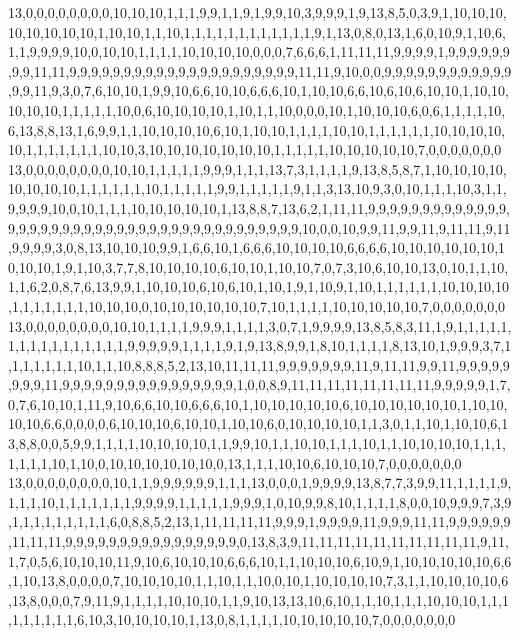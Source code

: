 13,0,0,0,0,0,0,0,0,10,10,10,1,1,1,9,9,1,1,9,1,9,9,10,3,9,9,9,1,9,13,8,5,0,3,9,1,10,10,10,10,10,10,10,10,1,10,10,1,1,10,1,1,1,1,1,1,1,1,1,1,1,1,9,1,13,0,8,0,13,1,6,0,10,9,1,10,6,1,1,9,9,9,9,10,0,10,10,1,1,1,1,10,10,10,10,0,0,0,7,6,6,6,1,11,11,11,9,9,9,9,1,9,9,9,9,9,9,9,9,11,11,9,9,9,9,9,9,9,9,9,9,9,9,9,9,9,9,9,9,9,9,9,11,11,9,10,0,0,9,9,9,9,9,9,9,9,9,9,9,9,9,9,11,9,3,0,7,6,10,10,1,9,9,10,6,6,10,10,6,6,6,10,1,10,10,6,6,10,6,10,6,10,10,1,10,10,10,10,10,1,1,1,1,1,10,0,6,10,10,10,10,1,10,1,1,10,0,0,0,10,1,10,10,10,6,0,6,1,1,1,1,10,6,13,8,8,13,1,6,9,9,1,1,10,10,10,10,6,10,1,10,10,1,1,1,1,10,10,1,1,1,1,1,1,10,10,10,10,10,1,1,1,1,1,1,1,10,10,3,10,10,10,10,10,10,10,1,1,1,1,1,10,10,10,10,10,7,0,0,0,0,0,0,0
13,0,0,0,0,0,0,0,0,10,10,1,1,1,1,1,9,9,9,1,1,1,13,7,3,1,1,1,1,9,13,8,5,8,7,1,10,10,10,10,10,10,10,10,1,1,1,1,1,1,10,1,1,1,1,1,9,9,1,1,1,1,1,9,1,1,3,13,10,9,3,0,10,1,1,1,10,3,1,1,9,9,9,9,10,0,10,1,1,1,10,10,10,10,10,1,13,8,8,7,13,6,2,1,11,11,9,9,9,9,9,9,9,9,9,9,9,9,9,9,9,9,9,9,9,9,9,9,9,9,9,9,9,9,9,9,9,9,9,9,9,9,9,9,9,9,10,0,0,10,9,9,11,9,9,11,9,11,11,9,11,9,9,9,9,3,0,8,13,10,10,10,9,9,1,6,6,10,1,6,6,6,10,10,10,10,6,6,6,6,10,10,10,10,10,10,10,10,10,1,9,1,10,3,7,7,8,10,10,10,10,6,10,10,1,10,10,7,0,7,3,10,6,10,10,13,0,10,1,1,10,1,1,6,2,0,8,7,6,13,9,9,1,10,10,10,6,10,6,10,1,10,1,9,1,10,9,1,10,1,1,1,1,1,1,10,10,10,10,1,1,1,1,1,1,1,10,10,10,0,10,10,10,10,10,10,7,10,1,1,1,1,10,10,10,10,10,7,0,0,0,0,0,0,0
13,0,0,0,0,0,0,0,0,10,10,1,1,1,1,9,9,9,1,1,1,1,3,0,7,1,9,9,9,9,13,8,5,8,3,11,1,9,1,1,1,1,1,1,1,1,1,1,1,1,1,1,1,1,9,9,9,9,9,1,1,1,1,9,1,9,13,8,9,9,1,8,10,1,1,1,1,8,13,10,1,9,9,9,3,7,1,1,1,1,1,1,1,10,1,1,10,8,8,8,5,2,13,10,11,11,11,9,9,9,9,9,9,9,11,9,11,11,9,9,11,9,9,9,9,9,9,9,9,11,9,9,9,9,9,9,9,9,9,9,9,9,9,9,9,9,1,0,0,8,9,11,11,11,11,11,11,11,11,9,9,9,9,9,1,7,0,7,6,10,10,1,11,9,10,6,6,10,10,6,6,6,10,1,10,10,10,10,10,6,10,10,10,10,10,10,1,10,10,10,10,6,6,0,0,0,0,6,10,10,10,6,10,10,1,10,10,6,0,10,10,10,10,1,1,3,0,1,1,10,1,10,10,6,13,8,8,0,0,5,9,9,1,1,1,1,10,10,10,10,1,1,9,9,10,1,1,10,10,1,1,1,10,1,1,10,10,10,10,1,1,1,1,1,1,1,10,1,10,0,10,10,10,10,10,10,0,13,1,1,1,10,10,6,10,10,10,7,0,0,0,0,0,0,0
13,0,0,0,0,0,0,0,0,10,1,1,9,9,9,9,9,9,1,1,1,13,0,0,0,1,9,9,9,9,13,8,7,7,3,9,9,11,1,1,1,1,9,1,1,1,10,1,1,1,1,1,1,1,9,9,9,9,1,1,1,1,1,9,9,9,1,0,10,9,9,8,10,1,1,1,1,8,0,0,10,9,9,9,7,3,9,1,1,1,1,1,1,1,1,1,6,0,8,8,5,2,13,1,11,11,11,11,9,9,9,1,9,9,9,9,11,9,9,9,11,11,9,9,9,9,9,9,11,11,11,9,9,9,9,9,9,9,9,9,9,9,9,9,9,9,9,0,13,8,3,9,11,11,11,11,11,11,11,11,11,11,9,11,1,7,0,5,6,10,10,10,11,9,10,6,10,10,10,6,6,6,10,1,1,10,10,10,6,10,9,1,10,10,10,10,10,6,6,1,10,13,8,0,0,0,0,7,10,10,10,10,1,1,10,1,1,10,0,10,1,10,10,10,10,7,3,1,1,10,10,10,10,6,13,8,0,0,0,7,9,11,9,1,1,1,1,10,10,10,1,1,9,10,13,13,10,6,10,1,1,10,1,1,1,10,10,10,1,1,1,1,1,1,1,1,1,6,10,3,10,10,10,10,1,13,0,8,1,1,1,1,10,10,10,10,10,7,0,0,0,0,0,0,0
